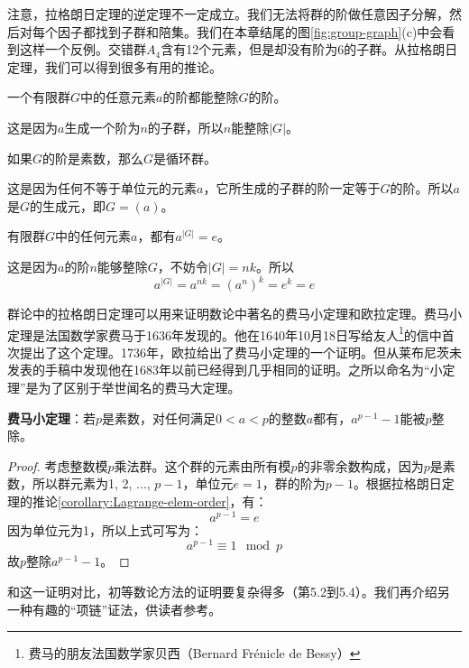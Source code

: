 \documentclass[b5paper]{ctexart}
\begin{document}
注意，拉格朗日定理的逆定理不一定成立。我们无法将群的阶做任意因子分解，然后对每个因子都找到子群和陪集。我们在本章结尾的图\ref{fig:group-graph}(c)中会看到这样一个反例。交错群$A_4$含有12个元素，但是却没有阶为6的子群。从拉格朗日定理，我们可以得到很多有用的推论。

\begin{corollary}
一个有限群$G$中的任意元素$a$的阶都能整除$G$的阶。
\end{corollary}

这是因为$a$生成一个阶为$n$的子群，所以$n$能整除$|G|$。

\begin{corollary}
如果$G$的阶是素数，那么$G$是循环群。
\end{corollary}

这是因为任何不等于单位元的元素$a$，它所生成的子群的阶一定等于$G$的阶。所以$a$是$G$的生成元，即$G = (a)$。

\begin{corollary}
有限群$G$中的任何元素$a$，都有$a^{|G|} = e$。
\label{corollary:Lagrange-elem-order}
\end{corollary}

这是因为$a$的阶$n$能够整除$G$，不妨令$|G| = nk$。所以
\[
a^{|G|} = a^{nk} = (a^n)^k = e^k = e
\]

群论中的拉格朗日定理可以用来证明数论中著名的费马小定理和欧拉定理。费马小定理是法国数学家费马于1636年发现的。他在1640年10月18日写给友人\footnote{费马的朋友法国数学家贝西（Bernard Frénicle de Bessy）}的信中首次提出了这个定理。1736年，欧拉给出了费马小定理的一个证明。但从莱布尼茨未发表的手稿中发现他在1683年以前已经得到几乎相同的证明。之所以命名为“小定理”是为了区别于举世闻名的费马大定理。

\begin{theorem}
\textbf{费马小定理}：若$p$是素数，对任何满足$0 < a < p$的整数$a$都有，$a^{p-1}-1$能被$p$整除。
\end{theorem}

\begin{proof}
考虑整数模$p$乘法群。这个群的元素由所有模$p$的非零余数构成，因为$p$是素数，所以群元素为1, 2, ..., $p-1$，单位元$e = 1$，群的阶为$p-1$。根据拉格朗日定理的推论\ref{corollary:Lagrange-elem-order}，有：
\[
a^{p-1} = e
\]
因为单位元为1，所以上式可写为：
\[
a^{p-1} \equiv 1 \mod p
\]
故$p$整除$a^{p-1} - 1$。
\end{proof}

和这一证明对比，初等数论方法的证明要复杂得多（\cite{StepanovRose15}第5.2到5.4）。我们再介绍另一种有趣的“项链”证法\cite{Wiki-FLT-proof}，供读者参考。
\end{document}
